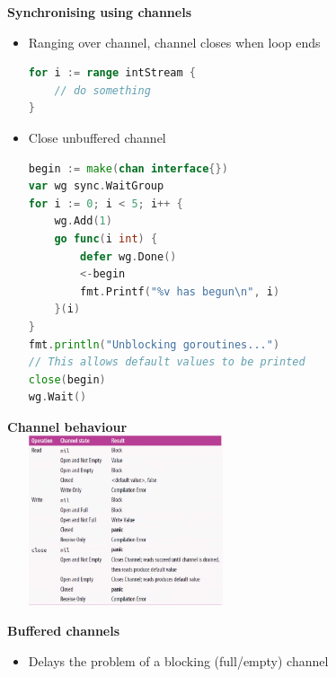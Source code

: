 \documentclass[10pt, landscape]{article}
\begin{document}
\begin{multicols}{4}
\textbf{Synchronising using channels} \\
\begin{itemize}
    \item Ranging over channel, channel closes when loop ends
    \begin{lstlisting}[language=Go, breaklines=true, breakatwhitespace=true]
for i := range intStream {
    // do something
}
    \end{lstlisting}
    \item Close unbuffered channel 
    \begin{lstlisting}[language=Go, breaklines=true, breakatwhitespace=true]
begin := make(chan interface{})
var wg sync.WaitGroup 
for i := 0; i < 5; i++ {
    wg.Add(1)
    go func(i int) {
        defer wg.Done()
        <-begin
        fmt.Printf("%v has begun\n", i)
    }(i)
}
fmt.println("Unblocking goroutines...")
// This allows default values to be printed
close(begin)
wg.Wait()
    \end{lstlisting}
\end{itemize}

\textbf{Channel behaviour} \\
\includegraphics*[width=7cm, height =5cm]{gobehaviour.png}


\textbf{Buffered channels} \\
\begin{itemize}
    \item Delays the problem of a blocking (full/empty) channel 
\end{itemize}


\end{multicols}
\end{document}
